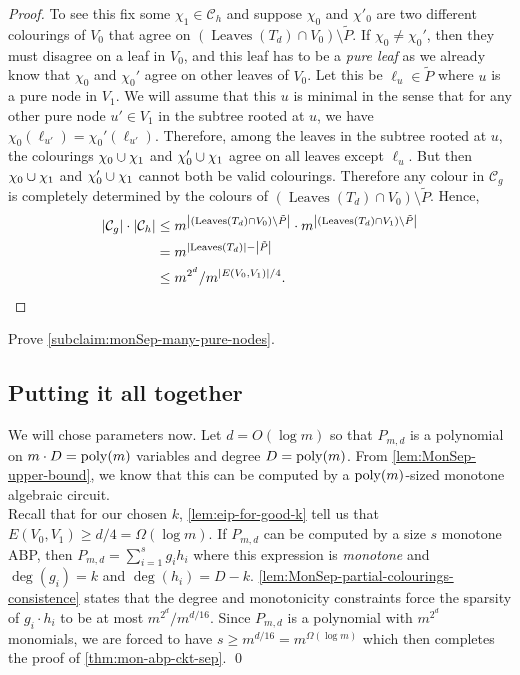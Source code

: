 \begin{proof}
To see this fix some $\chi_1 \in \mathcal{C}_h$ and suppose $\chi_0$ and $\chi'_0$ are two different colourings of $V_0$ that agree on $(\operatorname{Leaves}(T_d) \cap V_0) \setminus \tilde{P}$.
If $\chi_0 \neq \chi_0'$, then they must disagree on a leaf in $V_0$, and this leaf has to be a \emph{pure leaf} as we already know that $\chi_0$ and $\chi_0'$ agree on other leaves of $V_0$.
Let this be $\ell_u \in \tilde{P}$ where $u$ is a pure node in $V_1$.
We will assume that this $u$ is minimal in the sense that for any other pure node $u' \in V_1$ in the subtree rooted at $u$, we have $\chi_0(\ell_{u'}) = \chi_0'(\ell_{u'})$.
Therefore, among the leaves in the subtree rooted at $u$, the colourings $\chi_0 \cup \chi_1$ and $\chi_0' \cup \chi_1$ agree on all leaves except $\ell_u$.
But then $\chi_0 \cup \chi_1$ and $\chi_0' \cup \chi_1$ cannot both be valid colourings. Therefore any colour in $\mathcal{C}_g$ is completely determined by the colours of $(\operatorname{Leaves}(T_d) \cap V_0) \setminus \tilde{P}$.
Hence,
\begin{align*}
  \left|\mathcal{C}_g\right|\cdot \left|\mathcal{C}_h\right| & \leq  m^{\left|(\operatorname{Leaves}(T_d) \cap V_0) \setminus \tilde{P}\right|} \cdot m^{\left|(\operatorname{Leaves}(T_d) \cap V_1) \setminus \tilde{P}\right|}\\
                                               & = m^{\left|\operatorname{Leaves}(T_d)\right| - \left|\tilde{P}\right|}\\
                                               & \leq m^{2^d} / m^{\left|E(V_0,V_1)\right|/4}.
\end{align*}
\end{proof}

\begin{exercise}
Prove \autoref{subclaim:monSep-many-pure-nodes}.
\end{exercise}
\subsection*{Putting it all together}

We will chose parameters now. Let $d = O(\log m)$ so that $P_{m,d}$ is a polynomial on $m \cdot D = \operatorname{poly}(m)$ variables and degree $D = \operatorname{poly}(m)$. From \autoref{lem:MonSep-upper-bound}, we know that this can be computed by a $\operatorname{poly}(m)$-sized monotone algebraic circuit. \\

Recall that for our chosen $k$, \autoref{lem:eip-for-good-k} tell us that $E(V_0,V_1) \geq d/4 = \Omega(\log m)$. If $P_{m,d}$ can be computed by a size $s$ monotone ABP, then $P_{m,d} = \sum_{i=1}^s g_i h_i$ where this expression is \emph{monotone} and $\deg(g_i) = k$ and $\deg(h_i) = D - k$.
\autoref{lem:MonSep-partial-colourings-consistence} states that the degree and monotonicity constraints force the sparsity of $g_i\cdot h_i$ to be at most $m^{2^d} / m^{d/16}$. Since $P_{m,d}$ is a polynomial with $m^{2^d}$ monomials, we are forced to have $s \geq m^{d/16} = m^{\Omega(\log m)}$ which then completes the proof of \autoref{thm:mon-abp-ckt-sep}. \qed




